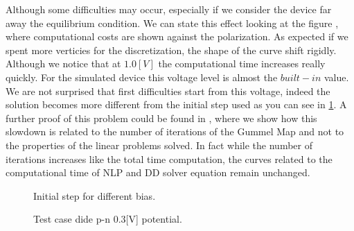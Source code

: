 Although some difficulties may occur, especially if we consider the device far away the equilibrium condition. We can state this effect looking at the figure , where computational costs are shown against the polarization.
As expected if we spent more verticies for the discretization, the shape of the curve shift rigidly.
Although we notice that at $1.0[V]$ the computational time increases really quickly. For the simulated device this voltage level is almost the $built-in$ value. We are not surprised that first difficulties start from this voltage, indeed the solution becomes more different from the initial step used as you can see in \ref{fig: different biast initial step}.
A further proof of this problem could be found in , where we show how this slowdown is related to the number of iterations of the Gummel Map and not to the properties of the linear problems solved. In fact while the number of iterations increases like the total time computation, the curves related to the computational time of NLP and DD solver equation remain unchanged.

\begin{figure}[!h]
\centering
{}
\caption{Initial step for different bias.}
\label{fig: different biast initial step}
\end{figure}
 







\clearpage 

\begin{figure}[!h]
\centering
{}
\hspace{1cm}
\caption{Test case dide p-n 0.3[V] potential.}
\label{fig: diode potential}
\end{figure}

